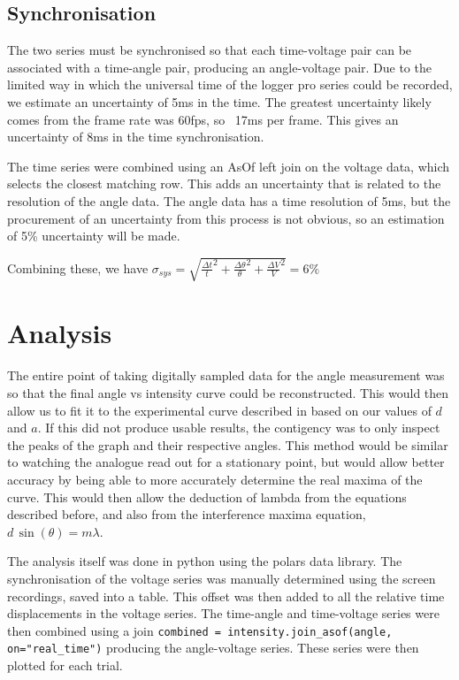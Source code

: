 \subsection*{Synchronisation}

The two series must be synchronised so that each time-voltage pair can be associated with a time-angle pair, producing an angle-voltage pair. Due to the limited way in which the universal time of the logger pro series could be recorded, we estimate an uncertainty of 5ms in the time. The greatest uncertainty likely comes from the frame rate was 60fps, so ~17ms per frame. This gives an uncertainty of 8ms in the time synchronisation.

The time series were combined using an AsOf left join on the voltage data, which selects the closest matching row. This adds an uncertainty that is related to the resolution of the angle data. The angle data has a time resolution of 5ms, but the procurement of an uncertainty from this process is not obvious, so an estimation of 5\% uncertainty will be made.

Combining these, we have $\sigma_{sys} = \sqrt{ \frac{\Delta t}{t}^2 + \frac{\Delta \theta}{\theta}^2 + \frac{\Delta V}{V}^2 } = 6\%$

\section*{Analysis}

The entire point of taking digitally sampled data for the angle measurement was so that the final angle vs intensity curve could be reconstructed. This would then allow us to fit it to the experimental curve described in  based on our values of $d$ and $a$. If this did not produce usable results, the contigency was to only inspect the peaks of the graph and their respective angles. This method would be similar to watching the analogue read out for a stationary point, but would allow better accuracy by being able to more accurately determine the real maxima of the curve. This would then allow the deduction of lambda from the equations described before, and also from the interference maxima equation, $d \, \sin(\theta) = m \lambda$.

The analysis itself was done in python using the polars data library. The synchronisation of the voltage series was manually determined using the screen recordings, saved into a table. 
This offset was then added to all the relative time displacements in the voltage series. The time-angle and time-voltage series were then combined using a join 
\verb|combined = intensity.join_asof(angle, on="real_time")| producing the angle-voltage series. These series were then plotted for each trial.

